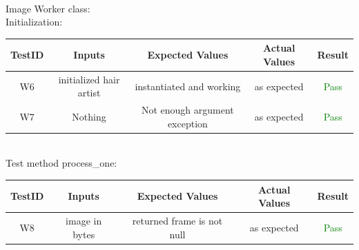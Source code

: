 \documentclass[12pt, oneside, openany, titlepage]{article}
\begin{document}
\\ \newline
Image Worker class: \\
Initialization: \\ 
\newline
\begin{tabular}{ |c|c|c|c|c| } 
 \hline
 TestID & Inputs & Expected Values & Actual Values & Result \\ 
 \hline
W6 & initialized hair artist & instantiated and working & as expected & \textcolor{green}{Pass} \\
W7 & Nothing & Not enough argument exception & as expected & \textcolor{green}{Pass} \\
 \hline
\end{tabular}
\\ \newline
Test method process\_one: \\
\newline
\begin{tabular}{ |c|c|c|c|c| } 
 \hline
 TestID & Inputs & Expected Values & Actual Values & Result \\ 
 \hline
W8 & image in bytes & returned frame is not null & as expected & \textcolor{green}{Pass} \\
 \hline
\end{tabular}
\end{document}
